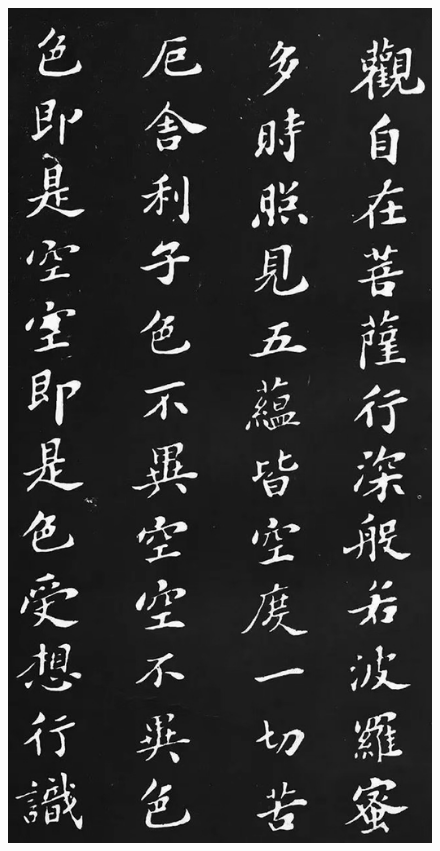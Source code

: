 \documentclass[a4paper,twoside]{article}
\begin{document}
\begin{figure}[ht]
\centering
\includegraphics[width=12.2cm]{images/sushi-1}
\end{figure}
\end{document}

